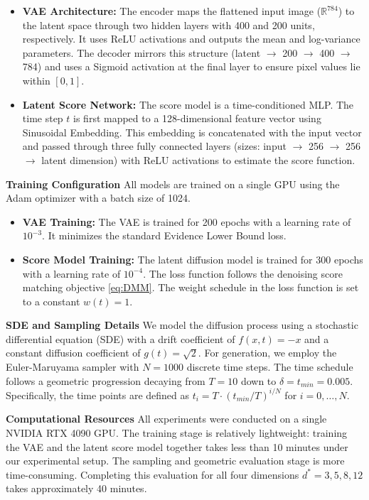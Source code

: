 \documentclass[11pt]{article}
\begin{document}
\begin{itemize}
    \item \textbf{VAE Architecture:} The encoder maps the flattened input image ($\mathbb{R}^{784}$) to the latent space through two hidden layers with 400 and 200 units, respectively. It uses ReLU activations and outputs the mean and log-variance parameters. The decoder mirrors this structure (latent $\to$ 200 $\to$ 400 $\to$ 784) and uses a Sigmoid activation at the final layer to ensure pixel values lie within $[0, 1]$.
    \item \textbf{Latent Score Network:} The score model is a time-conditioned MLP. The time step $t$ is first mapped to a 128-dimensional feature vector using Sinusoidal Embedding. This embedding is concatenated with the input vector and passed through three fully connected layers (sizes: input $\to$ 256 $\to$ 256 $\to$ latent dimension) with ReLU activations to estimate the score function.
\end{itemize}
\textbf{Training Configuration}
All models are trained on a single GPU using the Adam optimizer with a batch size of 1024.
\begin{itemize}
    \item \textbf{VAE Training:} The VAE is trained for 200 epochs with a learning rate of $10^{-3}$. It minimizes the standard Evidence Lower Bound loss.
    \item \textbf{Score Model Training:} The latent diffusion model is trained for 300 epochs with a learning rate of $10^{-4}$. The loss function follows the denoising score matching objective \eqref{eq:DMM}. The weight schedule in the loss function is set to a constant $w(t)=1$.
\end{itemize}
\textbf{SDE and Sampling Details} We model the diffusion process using a stochastic differential equation (SDE) with a drift coefficient of $f(x,t) = -x$ and a constant diffusion coefficient of $g(t) = \sqrt{2}$. For generation, we employ the Euler-Maruyama sampler with $N=1000$ discrete time steps. The time schedule follows a geometric progression decaying from $T=10$ down to $\delta = t_{min}=0.005$. Specifically, the time points are defined as $t_i = T \cdot (t_{min}/T)^{i/N}$ for $i=0, \dots, N$.

\noindent\textbf{Computational Resources} All experiments were conducted on a single NVIDIA RTX 4090 GPU. The training stage is relatively lightweight: training the VAE and the latent score model together takes less than 10 minutes under our experimental setup. The sampling and geometric evaluation stage is more time-consuming. Completing this evaluation for all four  dimensions $d^* = 3,5,8,12$ takes approximately 40 minutes. 
\end{document}
